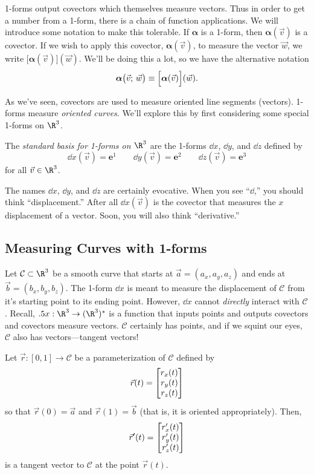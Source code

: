 1-forms output covectors which themselves measure vectors.
Thus in order to get a number from a 1-form, there is a chain
of function applications.  We will introduce some notation to make this
tolerable.  If $\bm \alpha$ is a 1-form, then
$\bm \alpha(\vec v)$ is a covector.  If we wish to apply this
covector, $\bm\alpha(\vec v)$,
to measure the vector $\vec w$, we write $\Big[\bm\alpha(\vec v)\Big](\vec w)$.
We'll be doing this a lot, so we have the alternative notation
\[
	\bm\alpha\big(\vec v;\, \vec w\big)  \equiv\Big[\bm\alpha(\vec v)\Big](\vec w).
\]


As we've seen, covectors are used to measure oriented line
segments (vectors).  1-forms measure \emph{oriented curves}.  We'll explore this by
first considering some special 1-forms on $\R^3$.

\begin{definition}
	The
	\emph{standard basis for 1-forms on $\R^3$} are the 1-forms
	$\dd x$, $\dd y$, and $\dd z$ defined by
	\[
		\dd x(\vec v) = \bm e^1\qquad \dd y(\vec v)=\bm e^2\qquad
		\dd z(\vec v) = \bm e^3
	\]
	for all $\vec v\in \R^3$.
\end{definition}

The names $\dd x$, $\dd y$, and $\dd z$
are certainly evocative.  When you see
``$\dd$,'' you should think ``displacement.''  After all
$\dd x(\vec v)$ is the covector that measures the $x$ displacement
of a vector.  Soon, you will
also think ``derivative.''

\subsection{Measuring Curves with 1-forms}

Let $\mathcal C\subset \R^3$ be a smooth curve that starts at $\vec a=(a_x,a_y,a_z)$
and ends at $\vec b=(b_x,b_y,b_z)$.  The 1-form $\dd x$ is meant to measure the
displacement of $\mathcal C$ from it's starting point to its ending point.
However, $\dd x$ cannot \emph{directly} interact with $\mathcal C$.
Recall, $\dd x:\R^3\to (\R^3)^*$ is a function that inputs points
and outputs covectors and covectors measure vectors.  $\mathcal C$ certainly
has points, and if we squint our eyes, $\mathcal C$ also has vectors---tangent
vectors!

Let $\vec r:[0,1]\to\mathcal C$ be a parameterization of $\mathcal C$ defined by
\[
\vec r(t) = \mat{r_x(t)\\r_y(t)\\r_z(t)}
\]
so that $\vec r(0)=\vec a$ and $\vec r(1)=\vec b$ (that is, it is oriented 
appropriately). Then, 
\[\vec r'(t) =\mat{r_x'(t)\\r_y'(t)\\r_z'(t)}
\]is a tangent vector to $\mathcal C$ at the
point $\vec r(t)$.

